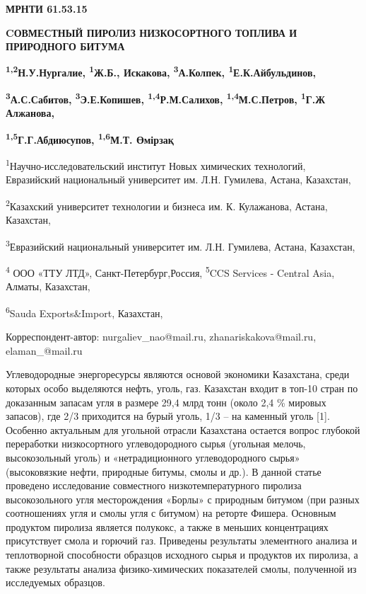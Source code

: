 \newpage
{\bfseries МРНТИ 61.53.15}

{\bfseries CОВМЕСТНЫЙ ПИРОЛИЗ НИЗКОСОРТНОГО ТОПЛИВА И ПРИРОДНОГО БИТУМА}

{\bfseries \textsuperscript{1,2}Н.У.Нургалие, \textsuperscript{1}Ж.Б.,
Искакова, \textsuperscript{3}А.Колпек,
\textsuperscript{1}Е.К.Айбульдинов,}

{\bfseries \textsuperscript{3}А.С.Сабитов, \textsuperscript{3}Э.Е.Копишев,
\textsuperscript{1,4}Р.М.Салихов, \textsuperscript{1,4}М.С.Петров,
\textsuperscript{1}Г.Ж Алжанова,}

{\bfseries \textsuperscript{1,5}Г.Г.Абдиюсупов, \textsuperscript{1,6}М.Т.
Өмірзақ}

\textsuperscript{1}Научно-исследовательский институт Новых химических
технологий, Евразийский национальный университет им. Л.Н. Гумилева,
Астана, Казахстан,

\textsuperscript{2}Казахский университет технологии и бизнеса им. К.
Кулажанова, Астана, Казахстан,

\textsuperscript{3}Евразийский национальный университет им. Л.Н.
Гумилева, Астана, Казахстан,

\textsuperscript{4} ООО «ТТУ ЛТД», Санкт-Петербург,Россия,
\textsuperscript{5}CCS Services - Central Asia, Алматы, Казахстан,

\textsuperscript{6}Sauda Exports\&Import, Казахстан,

Корреспондент-автор: nurgaliev\_nao@mail.ru, zhanariskakova@mail.ru,
elaman\_@mail.ru

Углеводородные энергоре­сурсы являются основой экономики Казахстана,
среди которых особо выделяются нефть, уголь, газ. Казахстан входит в
топ-10 стран по доказанным запасам угля в размере 29,4 млрд тонн (около
2,4 \% мировых запасов), где 2/3 приходится на бурый уголь, 1/3 -- на
каменный уголь {[}1{]}. Особенно актуальным для угольной отрасли
Казахстана остается вопрос глубокой переработки низкосортного
углеводородного сырья (угольная мелочь, высокозольный уголь) и
«нетрадиционного углеводородного сырья» (высоковязкие нефти, природные
битумы, смолы и др.). В данной статье проведено исследование совместного
низкотемпературного пиролиза высокозольного угля месторождения «Борлы» с
природным битумом (при разных соотношениях угля и смолы угля с битумом)
на реторте Фишера. Основным продуктом пиролиза является полукокс, а
также в меньших концентрациях присутствует смола и горючий газ.
Приведены результаты элементного анализа и теплотворной способности
образцов исходного сырья и продуктов их пиролиза, а также результаты
анализа физико-химических показателей смолы, полученной из исследуемых
образцов.

